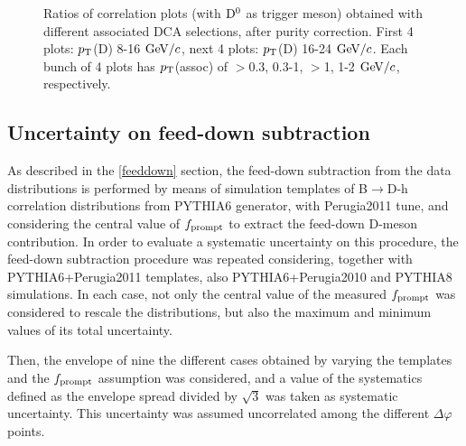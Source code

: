 \begin{figure}[h]
 \caption{Ratios of correlation plots (with ${\rm D^0}$ as trigger meson) obtained with different associated DCA selections, after purity correction. First 4 plots: $p_{\rm T}$(D) 8-16 $\mathrm{GeV}/c$, next 4 plots: $p_{\rm T}$(D) 16-24 $\mathrm{GeV}/c$. Each bunch of 4 plots has $p_{\rm T}$(assoc) of $>$0.3, 0.3-1, $>$1, 1-2 $\mathrm{GeV}/c$, respectively.}
\label{fig:DCAvarData2}
\end{figure}

\subsection{Uncertainty on feed-down subtraction}
As described in the \ref{feeddown} section, the feed-down subtraction from the data distributions is performed by means of simulation templates of B$\rightarrow$D-h correlation distributions from PYTHIA6 generator, with Perugia2011 tune, and considering the central value of $f_{\rm prompt}$ to extract the feed-down D-meson contribution. In order to evaluate a systematic uncertainty on this procedure, the feed-down subtraction procedure was repeated considering, together with PYTHIA6+Perugia2011 templates, also PYTHIA6+Perugia2010 and PYTHIA8 simulations. In each case, not only the central value of the measured $f_{\rm prompt}$ was considered to rescale the distributions, but also the maximum and minimum values of its total uncertainty.

Then, the envelope of nine the different cases obtained by varying the templates and the $f_{\rm prompt}$ assumption was considered, and a value of the systematics defined as the envelope spread divided by $\sqrt{3}$ was taken as systematic uncertainty. This uncertainty was assumed uncorrelated among the different $\Delta\varphi$ points.

